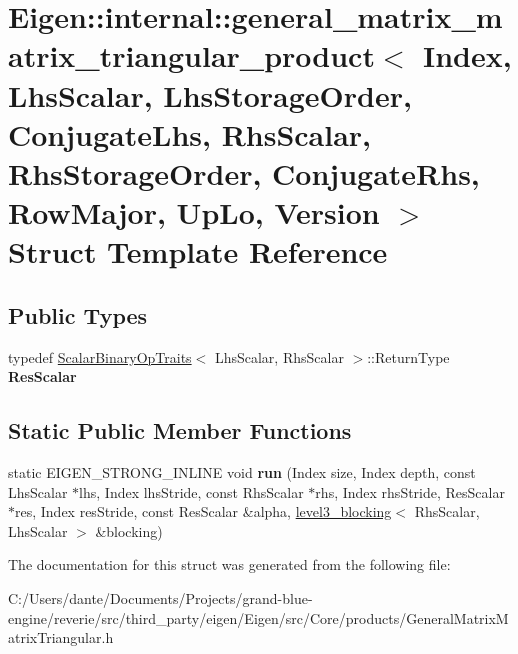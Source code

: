 \hypertarget{struct_eigen_1_1internal_1_1general__matrix__matrix__triangular__product_3_01_index_00_01_lhs_scd4c70a4453dce53548fa7c3d3f42cf39}{}\section{Eigen\+::internal\+::general\+\_\+matrix\+\_\+matrix\+\_\+triangular\+\_\+product$<$ Index, Lhs\+Scalar, Lhs\+Storage\+Order, Conjugate\+Lhs, Rhs\+Scalar, Rhs\+Storage\+Order, Conjugate\+Rhs, Row\+Major, Up\+Lo, Version $>$ Struct Template Reference}
\label{struct_eigen_1_1internal_1_1general__matrix__matrix__triangular__product_3_01_index_00_01_lhs_scd4c70a4453dce53548fa7c3d3f42cf39}
\subsection*{Public Types}
\begin{DoxyCompactItemize}
\item 
\mbox{\label{struct_eigen_1_1internal_1_1general__matrix__matrix__triangular__product_3_01_index_00_01_lhs_scd4c70a4453dce53548fa7c3d3f42cf39_adbc87d60ab316ca17ebc55ab8f3d3b0c}} 
typedef \mbox{\hyperlink{struct_eigen_1_1_scalar_binary_op_traits}{Scalar\+Binary\+Op\+Traits}}$<$ Lhs\+Scalar, Rhs\+Scalar $>$\+::Return\+Type {\bfseries Res\+Scalar}
\end{DoxyCompactItemize}
\subsection*{Static Public Member Functions}
\begin{DoxyCompactItemize}
\item 
\mbox{\label{struct_eigen_1_1internal_1_1general__matrix__matrix__triangular__product_3_01_index_00_01_lhs_scd4c70a4453dce53548fa7c3d3f42cf39_a4c3173e7245cf6cb5a961508402ebd95}} 
static E\+I\+G\+E\+N\+\_\+\+S\+T\+R\+O\+N\+G\+\_\+\+I\+N\+L\+I\+NE void {\bfseries run} (Index size, Index depth, const Lhs\+Scalar $\ast$lhs, Index lhs\+Stride, const Rhs\+Scalar $\ast$rhs, Index rhs\+Stride, Res\+Scalar $\ast$res, Index res\+Stride, const Res\+Scalar \&alpha, \mbox{\hyperlink{class_eigen_1_1internal_1_1level3__blocking}{level3\+\_\+blocking}}$<$ Rhs\+Scalar, Lhs\+Scalar $>$ \&blocking)
\end{DoxyCompactItemize}


The documentation for this struct was generated from the following file\+:\begin{DoxyCompactItemize}
\item 
C\+:/\+Users/dante/\+Documents/\+Projects/grand-\/blue-\/engine/reverie/src/third\+\_\+party/eigen/\+Eigen/src/\+Core/products/General\+Matrix\+Matrix\+Triangular.\+h\end{DoxyCompactItemize}
